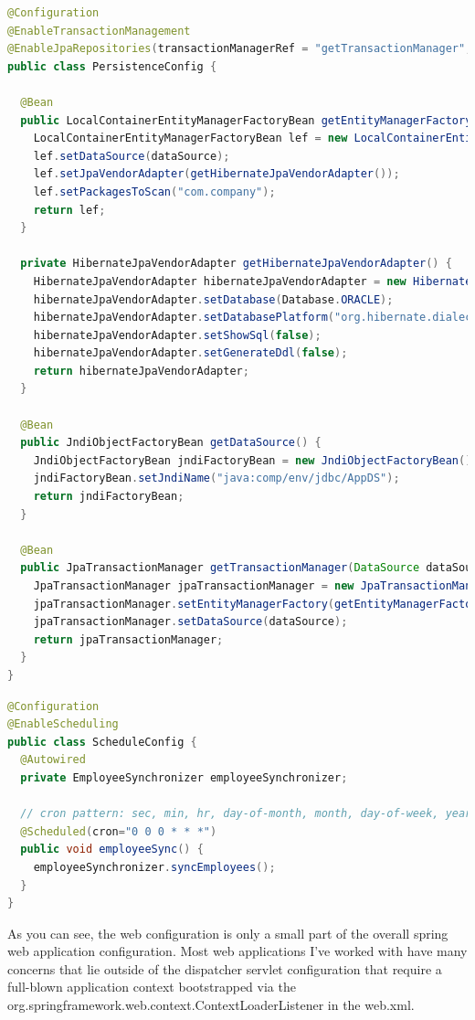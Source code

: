 \begin{lstlisting}[language=java, title=PersistenceConfig.java]
@Configuration
@EnableTransactionManagement
@EnableJpaRepositories(transactionManagerRef = "getTransactionManager", entityManagerFactoryRef = "getEntityManagerFactory", basePackages = "com.company")
public class PersistenceConfig {

  @Bean
  public LocalContainerEntityManagerFactoryBean getEntityManagerFactory(DataSource dataSource) {
    LocalContainerEntityManagerFactoryBean lef = new LocalContainerEntityManagerFactoryBean();
    lef.setDataSource(dataSource);
    lef.setJpaVendorAdapter(getHibernateJpaVendorAdapter());
    lef.setPackagesToScan("com.company");
    return lef;
  }

  private HibernateJpaVendorAdapter getHibernateJpaVendorAdapter() {
    HibernateJpaVendorAdapter hibernateJpaVendorAdapter = new HibernateJpaVendorAdapter();
    hibernateJpaVendorAdapter.setDatabase(Database.ORACLE);
    hibernateJpaVendorAdapter.setDatabasePlatform("org.hibernate.dialect.Oracle10gDialect");
    hibernateJpaVendorAdapter.setShowSql(false);
    hibernateJpaVendorAdapter.setGenerateDdl(false);
    return hibernateJpaVendorAdapter;
  }

  @Bean
  public JndiObjectFactoryBean getDataSource() {
    JndiObjectFactoryBean jndiFactoryBean = new JndiObjectFactoryBean();
    jndiFactoryBean.setJndiName("java:comp/env/jdbc/AppDS");
    return jndiFactoryBean;
  }

  @Bean
  public JpaTransactionManager getTransactionManager(DataSource dataSource) {
    JpaTransactionManager jpaTransactionManager = new JpaTransactionManager();
    jpaTransactionManager.setEntityManagerFactory(getEntityManagerFactory(dataSource).getObject());
    jpaTransactionManager.setDataSource(dataSource);
    return jpaTransactionManager;
  }
}
\end{lstlisting}


\begin{lstlisting}[language=java, title=ScheduleConfig.java]
@Configuration
@EnableScheduling
public class ScheduleConfig {
  @Autowired
  private EmployeeSynchronizer employeeSynchronizer;

  // cron pattern: sec, min, hr, day-of-month, month, day-of-week, year (optional)
  @Scheduled(cron="0 0 0 * * *")
  public void employeeSync() {
    employeeSynchronizer.syncEmployees();
  }
}
\end{lstlisting}

As you can see, the web configuration is only a small part of the overall spring web application configuration. Most web applications I've worked with have many concerns that lie outside of the dispatcher servlet configuration that require a full-blown application context bootstrapped via the org.springframework.web.context.ContextLoaderListener in the web.xml.


